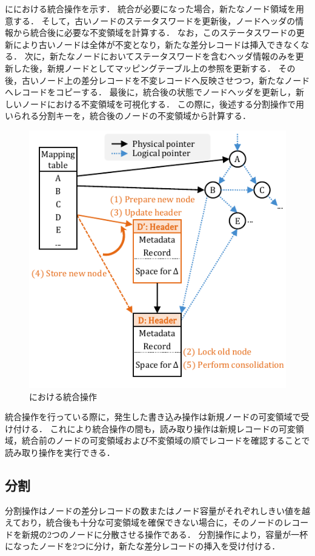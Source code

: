 \Fig{\ref{fig:bc_tree_consolidastion}}に\Bcforest{}における統合操作を示す．
統合が必要になった場合，新たなノード領域を用意する．
そして，古いノードのステータスワードを更新後，ノードヘッダの情報から統合後に必要な不変領域を計算する．
なお，このステータスワードの更新により古いノードは全体が不変となり，新たな差分レコードは挿入できなくなる．
次に，新たなノードにおいてステータスワードを含むヘッダ情報のみを更新した後，新規ノードとしてマッピングテーブル上の参照を更新する．
その後，古いノード上の差分レコードを不変レコードへ反映させつつ，新たなノードへレコードをコピーする．
最後に，統合後の状態でノードヘッダを更新し，新しいノードにおける不変領域を可視化する．
この際に，後述する分割操作で用いられる分割キーを，統合後のノードの不変領域から計算する．

\begin{figure}[t]
    \centering
    \includegraphics{./figures/Bc-consolidate.pdf}
    \caption{\Bcforest{}における統合操作}
    \label{fig:bc_tree_consolidastion}
\end{figure}

統合操作を行っている際に，発生した書き込み操作は新規ノードの可変領域で受け付ける．
これにより統合操作の間も，読み取り操作は新規レコードの可変領域，統合前のノードの可変領域および不変領域の順でレコードを確認することで読み取り操作を実行できる．

\subsection{分割}
分割操作はノードの差分レコードの数またはノード容量がそれぞれしきい値を越えており，統合後も十分な可変領域を確保できない場合に，そのノードのレコードを新規の2つのノードに分散させる操作である．
分割操作により，容量が一杯になったノードを2つに分け，新たな差分レコードの挿入を受け付ける．

